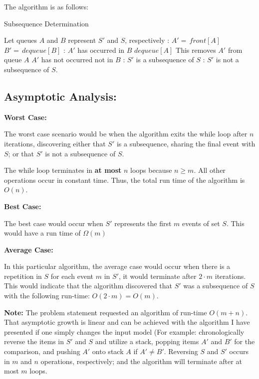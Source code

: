 \documentclass{article}
\begin{document}
The algorithm is as follows:

\begin{algorithm} %
\caption{Subsequence Determination} %
\begin{algorithmic} %
    \State Let queues $A$ and $B$ represent $S'$ and $S$, respectively
	:
		\State $ A' = \, front[A] $
		\State $ B' = \, dequeue[B] $
    	:
    		\State $A'$ has occurred in $B$
    		\State $dequeue[A]$
    		\Comment This removes $A'$ from queue $A$
    	\Else
    		\State $A'$ has not occurred not in $B$
    	\EndIf
	\EndWhile  
	:
		\State $S'$ is a subsequence of $S$
	\Else :
		\State $S'$ is not a subsequence of $S$.
	\EndIf  
\end{algorithmic}
\end{algorithm}

\subsection*{Asymptotic Analysis:}
\noindent \textbf{Worst Case:}

\noindent The worst case scenario would be when the algorithm exits the while loop after $n$ iterations, discovering either that $S'$ is a subsequence, sharing the final event with $S$; or that $S'$ is not a subsequence of $S$.

\noindent The while loop terminates in \textbf{at most} $n$ loops because $n \geq m$.
All other operations occur in constant time.  Thus, the total run time of the algorithm is $O(n)$.

\noindent \textbf{Best Case:}

\noindent The best case would occur when $S'$ represents the first $m$ events of set $S$.
This would have a run time of $\Omega(m)$

\noindent \textbf{Average Case:}

\noindent In this particular algorithm, the average case would occur when there is a repetition in $S$ for each event $m$ in $S'$, it would terminate after $2 \cdot m$ iterations.  This would indicate that the algorithm discovered that $S'$ was a subsequence of $S$ with the following run-time:  $O(2 \cdot m)= O(m)$. \newline

\noindent \textbf{Note:}  The problem statement requested an algorithm of run-time $O(m + n)$.  That asymptotic growth is linear and can be achieved with the algorithm I have presented if one simply changes the input model (For example: chronologically reverse the items in $S'$ and $S$ and utilize a stack, popping items $A'$ and $B'$ for the comparison, and pushing $A'$ onto stack $A$ if $A' \neq B'$.
Reversing $S$ and $S'$ occurs in $m$ and $n$ operations, respectively; and the algorithm will terminate after at most $m$ loops.
\end{document}
